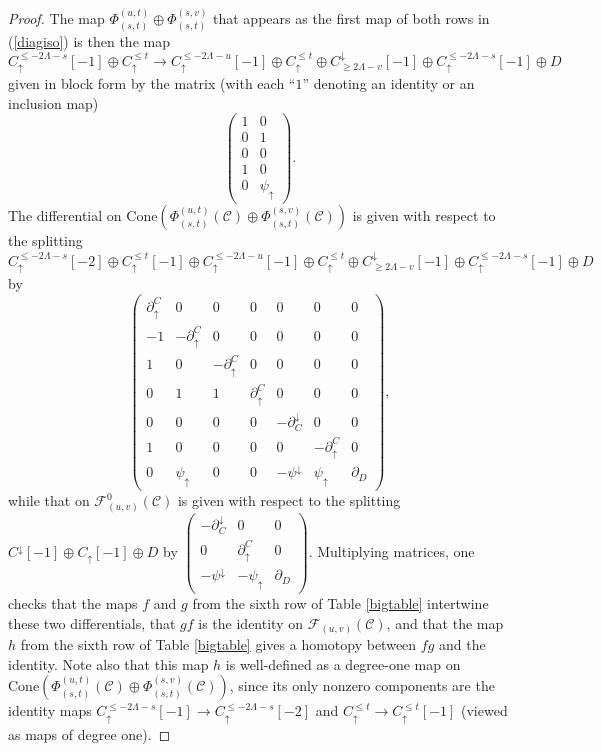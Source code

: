 \documentclass[11pt]{amsart}
\theoremstyle{definition}
\theoremstyle{remark}
\numberwithin{equation}{section}
\begin{document}
\begin{proof}
The map $\Phi_{(s,t)}^{(u,t)}\oplus \Phi_{(s,t)}^{(s,v)}$ that appears as the first map of both rows in (\ref{diagiso}) is then the map \[ C_{\uparrow}^{\leq -2\Lambda-s}[-1]\oplus C_{\uparrow}^{\leq t}\to C_{\uparrow}^{\leq -2\Lambda-u}[-1]\oplus C_{\uparrow}^{\leq t}\oplus C^{\downarrow}_{\geq 2\Lambda-v}[-1]\oplus C_{\uparrow}^{\leq -2\Lambda-s}[-1]\oplus D \] given in block form by the matrix (with each ``$1$'' denoting an identity or an inclusion map) \[ \left( \begin{array}{cc} 1 & 0 \\ 0 & 1 \\ 0 & 0 \\ 1 & 0 \\ 0 & \psi_{\uparrow} \end{array}\right). \]  The differential on $\mathrm{Cone}(\Phi_{(s,t)}^{(u,t)}(\mathcal{C})\oplus \Phi_{(s,t)}^{(s,v)}(\mathcal{C}))$ is given with respect to the splitting $
C_{\uparrow}^{\leq -2\Lambda-s}[-2]\oplus C_{\uparrow}^{\leq t}[-1]\oplus C_{\uparrow}^{\leq -2\Lambda-u}[-1]\oplus C_{\uparrow}^{\leq t}\oplus C^{\downarrow}_{\geq 2\Lambda-v}[-1]\oplus C_{\uparrow}^{\leq -2\Lambda-s}[-1]\oplus D$ by \[ \left(\begin{array}{ccccccc}\partial^{C}_{\uparrow} & 0 & 0 & 0 & 0 & 0 & 0 \\ -1 & -\partial_{\uparrow}^{C} & 0 & 0 & 0 & 0 & 0 \\  1 & 0 & -\partial_{\uparrow}^{C} & 0 & 0 & 0 & 0 \\ 0 & 1 & 1 & \partial_{\uparrow}^{C} & 0 & 0 & 0 \\ 0  & 0 & 0 & 0 & -\partial^{\downarrow}_{C} & 0 & 0 \\ 1 & 0 & 0 & 0 & 0 & -\partial_{\uparrow}^{C} & 0 \\ 0 & \psi_{\uparrow} & 0 & 0 & -\psi^{\downarrow} & \psi_{\uparrow} & \partial_D   \end{array}\right),  \] while that on $\mathcal{F}_{(u,v)}^{0}(\mathcal{C})$ is given with respect to the splitting $C^{\downarrow}[-1]\oplus C_{\uparrow}[-1]\oplus D$ by $\left(\begin{array}{ccc} -\partial^{\downarrow}_{C} & 0 & 0 \\ 0 & \partial_{\uparrow}^{C} & 0 \\ -\psi^{\downarrow} & -\psi_{\uparrow} & \partial_D \end{array}\right)$.  Multiplying matrices, one checks that the maps $f$ and $g$ from the sixth row of Table \ref{bigtable} intertwine these two differentials, that $gf$ is the identity on $\mathcal{F}_{(u,v)}(\mathcal{C})$, and that the map $h$ from the sixth row of Table \ref{bigtable} gives a homotopy between $fg$ and the identity. Note also that this map $h$ is well-defined as a degree-one map on $\mathrm{Cone}(\Phi_{(s,t)}^{(u,t)}(\mathcal{C})\oplus \Phi_{(s,t)}^{(s,v)}(\mathcal{C}))$, since its only nonzero components are the identity maps $C_{\uparrow}^{\leq -2\Lambda-s}[-1]\to C_{\uparrow}^{\leq -2\Lambda-s}[-2]$ and $C_{\uparrow}^{\leq t}\to C_{\uparrow}^{\leq t}[-1]$ (viewed as maps of degree one).


\end{proof}
\end{document}
